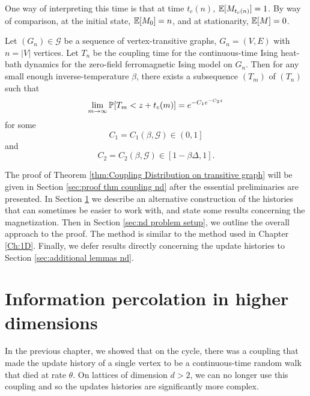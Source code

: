 One way of interpreting this time is that at time $t_c(n)$, $\mathbb{E}[M_{t_c(n)}] = 1$. By way of comparison, at the initial state, $\mathbb{E}[M_0] = n$, and at stationarity, $\mathbb{E}[M] = 0$.


\begin{theorem}
\label{thm:Coupling Distribution on transitive graph}
	Let $(G_n) \in \mathscr{G}$ be a sequence of vertex-transitive graphs, $G_n = (V, E)$ with $n = |V|$ vertices. Let $T_n$ be the coupling time for the continuous-time Ising heat-bath dynamics for the zero-field ferromagnetic Ising model on $G_n$. Then for any small enough inverse-temperature $\beta$, there exists a subsequence $(T_m)$ of $(T_n)$ such that
	\begin{equation}
		\lim_{m \rightarrow \infty} \mathbb{P}[T_m < z + t_c(m)] = e^{-C_1e^{-C_2 z}}
	\end{equation}
	for some
	\begin{equation}
		C_1 = C_1(\beta, \mathscr{G}) \in \left(0,1\right]
	\end{equation}
	and
	\begin{equation}
		C_2 = C_2(\beta, \mathscr{G}) \in \left[1 - \beta \Delta, 1\right].
	\end{equation}

\end{theorem}

The proof of Theorem \ref{thm:Coupling Distribution on transitive graph} will be given in Section \ref{sec:proof thm coupling nd} after the essential preliminaries are presented. In Section \ref{sec:information percolation in higher dimensions} we describe an alternative construction of the histories that can sometimes be easier to work with, and state some results concerning the magnetization. Then in Section \ref{sec:nd problem setup}, we outline the overall approach to the proof. The method is similar to the method used in Chapter \ref{Ch:1D}. Finally, we defer results directly concerning the update histories to Section \ref{sec:additional lemmas nd}.

\section{Information percolation in higher dimensions}
\label{sec:information percolation in higher dimensions}
In the previous chapter, we showed that on the cycle, there was a coupling that made the update history of a single vertex to be a continuous-time random walk that died at rate $\theta$. On lattices of dimension $d > 2$, we can no longer use this coupling and so the updates histories are significantly more complex. 

